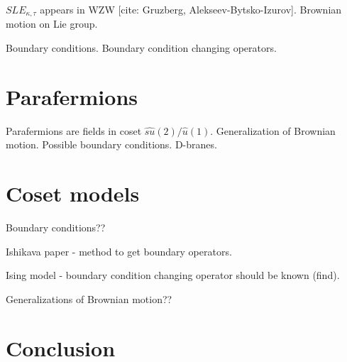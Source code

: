 \documentclass[12pt]{article}
\theoremstyle{definition}
\theoremstyle{definition} \newtheorem{Def}{Definition}
\begin{document}
$SLE_{\kappa,\tau}$ appears in WZW [cite: Gruzberg, Alekseev-Bytsko-Izurov]. Brownian motion on Lie group.

Boundary conditions. Boundary condition changing operators. 

\section{Parafermions}
\label{sec:parafermions}

Parafermions are fields in coset $\hat{su}(2)/\hat{u}(1)$. Generalization of Brownian motion. Possible boundary conditions. D-branes. 

\section{Coset models}
\label{sec:coset-models}

Boundary conditions??

Ishikava paper - method to get boundary operators. 

Ising model - boundary condition changing operator should be known (find).

Generalizations of Brownian motion??

\section{Conclusion}
\label{sec:conclusion}

{}

\end{document}
